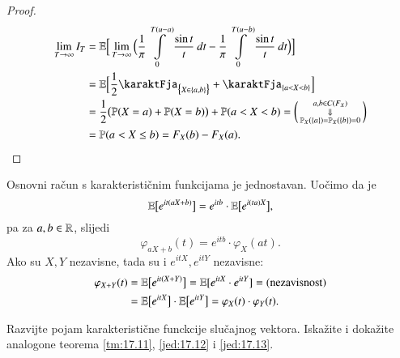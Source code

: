 \begin{proof}
\begin{equation*}
\begin{aligned}
            \lim\limits_{T \to \infty} I_T &= \masE \Big[ \lim\limits_{T \to \infty} \Big( \frac{1}{\pi} \int\limits_0^{T (u - a)} \frac{\sin t}{t} \: dt - \frac{1}{\pi} \int\limits_0^{T (u - b)} \frac{\sin t}{t} \: d t \Big) \Big]\\
            &= \masE \Big[ \frac{1}{2} \karaktFja_{\big\{ X \in \{a, b\} \big\}} + \karaktFja_{\{a < X < b\}} \Big]\\
            &= \frac{1}{2} \big( \masP (X = a) + \masP (X = b) \big) + \masP (a < X < b) =
            \begin{psmallmatrix}
                a, b \in C(F_X)\\
                \Downarrow\\
                \masP_X (\{ a \}) = \masP_X (\{ b \}) = 0
            \end{psmallmatrix}\\
            &= \masP ( a < X \leq b) = F_X (b) - F_X (a).
        \end{aligned}
    \end{equation*}
\end{proof}

Osnovni ra\v cun s karakteristi\v cnim funkcijama je jednostavan.
Uo\v cimo da je
\begin{equation*}
    \mathbb{E} \big[ e^{it (aX+b)} \big] = e^{itb} \cdot \mathbb{E} \big[ e^{i (ta) X} \big],
\end{equation*}
pa za $a, b \in \mathbb{R}$, slijedi
\begin{equation}    \label{jed:17.12}
    \varphi_{aX+b} (t) = e^{itb} \cdot \varphi_X (a t).
\end{equation}
Ako su $X, Y$ nezavisne, tada su i $e^{itX}, e^{itY}$ nezavisne:
\begin{equation}    \label{jed:17.13}
    \begin{aligned}
        \varphi_{X+Y} (t) &= \mathbb{E} \big[ e^{it(X+Y)} \big] = \mathbb{E} [e^{itX} \cdot e^{itY}] = (\textnormal{nezavisnost})\\
        &= \mathbb{E} \big[ e^{itX} \big] \cdot \mathbb{E} \big[ e^{itY} \big] = \varphi_X (t) \cdot \varphi_Y (t).
    \end{aligned}
\end{equation}

\begin{zad} \label{zad:17.14}
    Razvijte pojam karakteristi\v cne funckcije slu\v cajnog vektora.
    Iska\v zite i doka\v zite analogone teorema \ref{tm:17.11}, \eqref{jed:17.12} i \eqref{jed:17.13}.
\end{zad}

